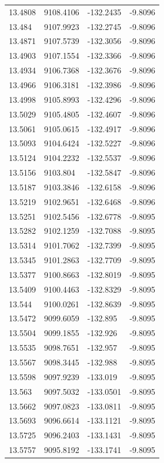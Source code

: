 \begin{table}[H]
\begin{tabular}{llll}
13.4808 & 9108.4106 & -132.2435 & -9.8096 \\
13.484 & 9107.9923 & -132.2745 & -9.8096 \\
13.4871 & 9107.5739 & -132.3056 & -9.8096 \\
13.4903 & 9107.1554 & -132.3366 & -9.8096 \\
13.4934 & 9106.7368 & -132.3676 & -9.8096 \\
13.4966 & 9106.3181 & -132.3986 & -9.8096 \\
13.4998 & 9105.8993 & -132.4296 & -9.8096 \\
13.5029 & 9105.4805 & -132.4607 & -9.8096 \\
13.5061 & 9105.0615 & -132.4917 & -9.8096 \\
13.5093 & 9104.6424 & -132.5227 & -9.8096 \\
13.5124 & 9104.2232 & -132.5537 & -9.8096 \\
13.5156 & 9103.804 & -132.5847 & -9.8096 \\
13.5187 & 9103.3846 & -132.6158 & -9.8096 \\
13.5219 & 9102.9651 & -132.6468 & -9.8096 \\
13.5251 & 9102.5456 & -132.6778 & -9.8095 \\
13.5282 & 9102.1259 & -132.7088 & -9.8095 \\
13.5314 & 9101.7062 & -132.7399 & -9.8095 \\
13.5345 & 9101.2863 & -132.7709 & -9.8095 \\
13.5377 & 9100.8663 & -132.8019 & -9.8095 \\
13.5409 & 9100.4463 & -132.8329 & -9.8095 \\
13.544 & 9100.0261 & -132.8639 & -9.8095 \\
13.5472 & 9099.6059 & -132.895 & -9.8095 \\
13.5504 & 9099.1855 & -132.926 & -9.8095 \\
13.5535 & 9098.7651 & -132.957 & -9.8095 \\
13.5567 & 9098.3445 & -132.988 & -9.8095 \\
13.5598 & 9097.9239 & -133.019 & -9.8095 \\
13.563 & 9097.5032 & -133.0501 & -9.8095 \\
13.5662 & 9097.0823 & -133.0811 & -9.8095 \\
13.5693 & 9096.6614 & -133.1121 & -9.8095 \\
13.5725 & 9096.2403 & -133.1431 & -9.8095 \\
13.5757 & 9095.8192 & -133.1741 & -9.8095 \\

\end{tabular}
\end{table}
